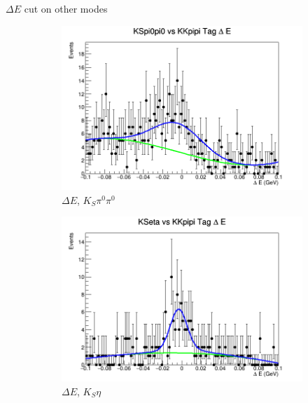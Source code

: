 \documentclass{beamer}
\begin{document}
\begin{frame}{$\Delta E$ cut on other modes}
  \begin{figure}
    \centering
    \begin{subfigure}{0.4\textwidth}
      \centering
      \includegraphics[width=\textwidth]{KSpi0pi0TagDeltaE.png}
      \caption{$\Delta E$, $K_S\pi^0\pi^0$}
    \end{subfigure}%
    \begin{subfigure}{0.4\textwidth}
      \centering
      \includegraphics[width=\textwidth]{KSetaTagDeltaE.png}
      \caption{$\Delta E$, $K_S\eta$}
    \end{subfigure}
    \centering
    \begin{subfigure}{0.4\textwidth}
      \centering

\end{subfigure}
\end{figure}
\end{frame}
\end{document}
